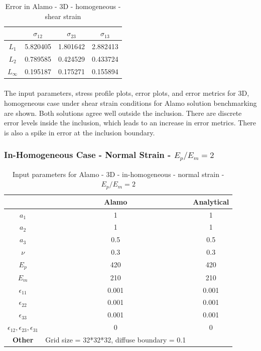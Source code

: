 \documentclass[12pt, a4paper]{report}
\begin{document}
\begin{table}[H]
    \centering
    \begin{tabular}{|c|c|c|c|}
        \hline
        &\textbf{$\sigma_{12}$} &  \textbf{$\sigma_{23}$} & \textbf{$\sigma_{13}$}\\
        \hline
        $L_1$ & 5.820405 & 1.801642 & 2.882413 \\
        \hline
        $L_2$ & 0.789585 & 0.424529 & 0.433724 \\
        \hline 
        $L_\infty$ & 0.195187 & 0.175271 & 0.155894 \\
        \hline
    \end{tabular}
    \caption{Error in Alamo - 3D - homogeneous - shear strain}
\end{table}
\paragraph{}
The input parameters, stress profile plots, error plots, and error metrics for 3D, homogeneous case under shear strain conditions for Alamo solution benchmarking are shown. Both solutions agree well outside the inclusion. There are discrete error levels inside the inclusion, which leads to an increase in error metrics. There is also a spike in error at the inclusion boundary.

\newpage

\subsubsection{In-Homogeneous Case - Normal Strain - $E_p/E_m = 2$}
\begin{table}[H]
    \centering
    \begin{tabular}{|c|c|c|}
        \hline
        & \textbf{Alamo} &\textbf{Analytical}\\
        \hline
        \textbf{$a_1$} & 1 & 1 \\
        \hline
        \textbf{$a_2$} & 1 & 1 \\
        \hline
        \textbf{$a_3$} & 0.5 & 0.5 \\
        \hline
        \textbf{$\nu$} & 0.3 & 0.3 \\
        \hline
        \textbf{$E_p$} & 420 & 420 \\
        \hline
        \textbf{$E_m$} & 210 & 210 \\
        \hline
        \textbf{$\epsilon_{11}$} & 0.001 & 0.001 \\
        \hline
        \textbf{$\epsilon_{22}$} & 0.001 & 0.001 \\
        \hline
        \textbf{$\epsilon_{33}$} & 0.001 & 0.001 \\
        \hline
        \textbf{$\epsilon_{12}, \epsilon_{23}, \epsilon_{31}$} & 0 & 0 \\
        \hline
        \textbf{Other} & Grid size = 32*32*32, diffuse boundary = 0.1 &  \\
        \hline
    \end{tabular}
    \caption{Input parameters for Alamo - 3D - in-homogeneous - normal strain - $E_p/E_m = 2$}
\end{table}
\end{document}
